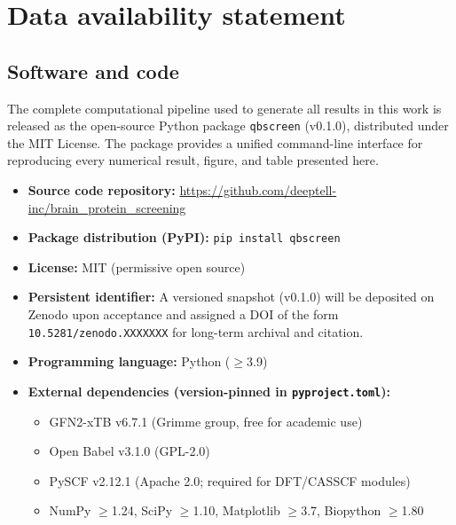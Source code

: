 %
%

\section*{Data availability statement}

\subsection*{Software and code}

The complete computational pipeline used to generate all results in this work is released as the open-source Python package \texttt{qbscreen} (v0.1.0), distributed under the MIT License. The package provides a unified command-line interface for reproducing every numerical result, figure, and table presented here.

\begin{itemize}
\setlength{\itemsep}{0pt}
\item \textbf{Source code repository:} \url{https://github.com/deeptell-inc/brain_protein_screening}
\item \textbf{Package distribution (PyPI):} \texttt{pip install qbscreen}
\item \textbf{License:} MIT (permissive open source)
\item \textbf{Persistent identifier:} A versioned snapshot (v0.1.0) will be deposited on Zenodo upon acceptance and assigned a DOI of the form \texttt{10.5281/zenodo.XXXXXXX} for long-term archival and citation.
\item \textbf{Programming language:} Python ($\geq$3.9)
\item \textbf{External dependencies (version-pinned in \texttt{pyproject.toml}):}
\begin{itemize}
\setlength{\itemsep}{0pt}
\item GFN2-xTB v6.7.1 (Grimme group, free for academic use)
\item Open Babel v3.1.0 (GPL-2.0)
\item PySCF v2.12.1 (Apache 2.0; required for DFT/CASSCF modules)
\item NumPy $\geq$1.24, SciPy $\geq$1.10, Matplotlib $\geq$3.7, Biopython $\geq$1.80
\end{itemize}
\end{itemize}

